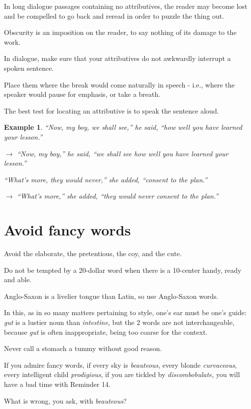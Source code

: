 \documentclass{book}
\numberwithin{equation}{section}
\newtheorem{example}{Example}[chapter]
\begin{document}
In long dialogue passages containing no attributives, the reader may become lost and be compelled to go back and reread in order to puzzle the thing out.

Obscurity is an imposition on the reader, to say nothing of its damage to the work.

%
In dialogue, make sure that your attributives do not awkwardly interrupt a spoken sentence.

Place them where the break would come naturally in speech - i.e., where the speaker would pause for emphasis, or take a breath.

The best test for locating an attributive is to speak the sentence aloud.
\begin{example}
    ``Now, my boy, we shall see,'' he said, ``how well you have learned your lesson.''
    
    $\to$ ``Now, my boy,'' he said, ``we shall see how well you have learned your lesson.''
    
    ``What's more, they would never,'' she added, ``consent to the plan.''
    
    $\to$ ``What's more,'' she added, ``they would never consent to the plan.''
\end{example}

\section{Avoid fancy words}
Avoid the elaborate, the pretentious, the coy, and the cute.

Do not be tempted by a 20-dollar word when there is a 10-center handy, ready and able.

Anglo-Saxon is a livelier tongue than Latin, so use Anglo-Saxon words.

In this, as in so many matters pertaining to style, one's ear must be one's guide: \textit{gut} is a lustier noun than \textit{intestine}, but the 2 words are not interchangeable, because \textit{gut} is often inappropriate, being too coarse for the context.

Never call a stomach a tummy without good reason.

%
If you admire fancy words, if every sky is \textit{beauteous}, every blonde \textit{curvaceous}, every intelligent child \textit{prodigious}, if you are tickled by \textit{discombobulate}, you will have a bad time with Reminder 14.

What is wrong, you ask, with \textit{beauteous}?
\end{document}
